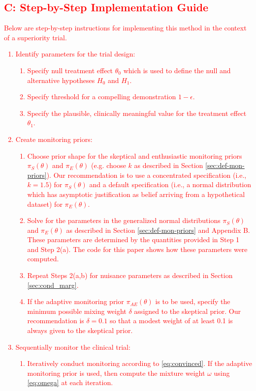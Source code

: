 \documentclass[12pt]{article}
\begin{document}
\textcolor{red}{
\subsection*{C: Step-by-Step Implementation Guide}
Below are step-by-step instructions for implementing this method in the context of a superiority trial.
\begin{enumerate}
\item Identify parameters for the trial design:
\begin{enumerate}
\item Specify null treatment effect $\theta_0$ which is used to define the null and alternative hypotheses $H_0$ and $H_1$.
\item Specify threshold for a compelling demonstration $1-\epsilon$.
\item Specify the plausible, clinically meaningful value for the treatment effect $\theta_1$.
\end{enumerate}
\item Create monitoring priors:
\begin{enumerate}
\item Choose prior shape for the skeptical and enthusiastic monitoring priors $\pi_S(\theta)$ and $\pi_E(\theta)$ (e.g. choose $k$ as described in Section \ref{sec:def-mon-priors}). Our recommendation is to use a concentrated specification (i.e., $k=1.5$)  for $\pi_S(\theta)$ and a default specification (i.e., a normal distribution which has asymptotic justification as belief arriving from a hypothetical dataset) for $\pi_E(\theta)$.
\item Solve for the parameters in the generalized normal distributions $\pi_S(\theta)$ and $\pi_E(\theta)$ as described in Section \ref{sec:def-mon-priors} and Appendix B. These parameters are determined by the quantities provided in Step 1 and Step 2(a). The code for this paper shows how these parameters were computed.
\item Repeat Steps 2(a,b) for nuisance parameters as described in Section \ref{sec:cond_marg}.
\item If the adaptive monitoring prior $\pi_{AE}(\theta)$ is to be used, specify the minimum possible mixing weight $\delta$ assigned to the skeptical prior. Our recommendation is $\delta=0.1$ so that a modest weight of at least 0.1 is always given to the skeptical prior.
\end{enumerate}
\item Sequentially monitor the clinical trial:
\begin{enumerate}
\item Iteratively conduct monitoring according to \eqref{eq:convinced}. If the adaptive monitoring prior is used, then compute the mixture weight $\omega$ using \eqref{eq:omega} at each iteration.
\end{enumerate}
\end{enumerate}
}
\end{document}
